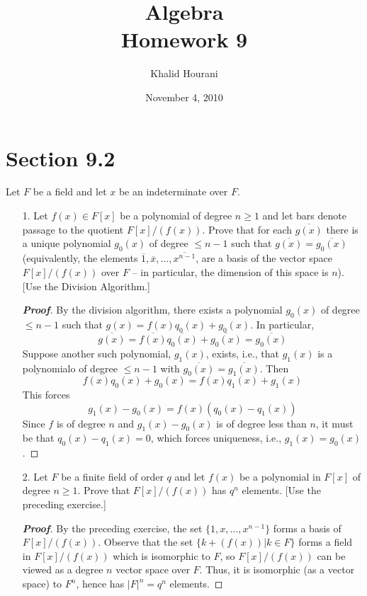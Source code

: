 \documentclass[12pt,leqno]{book}
\title{Algebra\\\large Homework 9}
\date{November 4, 2010}
\author{Khalid Hourani}
\theoremstyle{definition}
\newenvironment{Proof}{\begin{proof}[\textnormal{\textbf{Proof}}]}{\end{proof}}
\begin{document}
 \begin{titlepage}
  \maketitle
 \end{titlepage}

\section*{Section 9.2}
Let $F$ be a field and let $x$ be an indeterminate over $F$.
\begin{enumerate}
 \item [1.] Let $f(x)\in F[x]$ be a polynomial of degree $n\geq1$ and let bars denote passage to the quotient $F[x]/(f(x))$. Prove that for each $\overline{g(x)}$ there is a unique polynomial $g_0(x)$ of degree $\leq n-1$ such that $\overline{g(x)}=\overline{g_0(x)}$ (equivalently, the elements $\overline{1},\overline{x},\hdots,\overline{x^{n-1}}$, are a basis of the vector space $F[x]/(f(x))$ over $F$ -- in particular, the dimension of this space is $n$). [Use the Division Algorithm.]

\begin{Proof}
 By the division algorithm, there exists a polynomial $g_0(x)$ of degree $\leq n-1$ such that $g(x)=f(x)q_0(x)+g_0(x)$. In particular, \[\overline{g(x)}=\overline{f(x)}\overline{q_0(x)}+\overline{g_0(x)}=\overline{g_0(x)}\] Suppose another such polynomial, $g_1(x)$, exists, i.e., that $g_1(x)$ is a polynomialo of degree $\leq n-1$ with $\overline{g_0(x)}=\overline{g_1(x)}$. Then \[f(x)q_0(x)+g_0(x)=f(x)q_1(x)+g_1(x)\] This forces \[g_1(x)-g_0(x)=f(x)(q_0(x)-q_1(x))\] Since $f$ is of degree $n$ and $g_1(x)-g_0(x)$ is of degree less than $n$, it must be that $q_0(x)-q_1(x)=0$, which forces uniqueness, i.e., $g_1(x)=g_0(x)$.
\end{Proof}

 \item [2.] Let $F$ be a finite field of order $q$ and let $f(x)$ be a polynomial in $F[x]$ of degree $n\geq1$. Prove that $F[x]/(f(x))$ has $q^n$ elements. [Use the preceding exercise.]

\begin{Proof} 
 By the preceding exercise, the set $\{1,x,\hdots,x^{n-1}\}$ forms a basis of $F[x]/(f(x))$. Observe that the set $\{k+(f(x))|k\in F\}$ forms a field in $F[x]/(f(x))$ which is isomorphic to $F$, so $F[x]/(f(x))$ can be viewed as a degree $n$ vector space over $F$. Thus, it is isomorphic (as a vector space) to $F^n$, hence has $|F|^n=q^n$ elements.
\end{Proof}


\end{enumerate}
\end{document}
